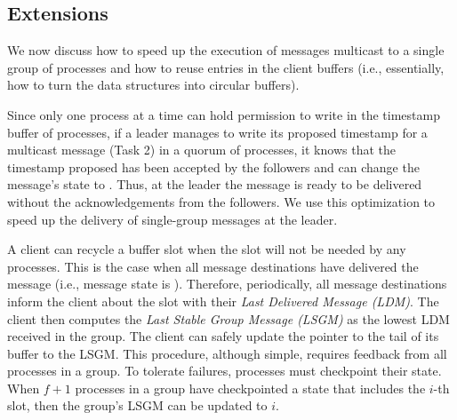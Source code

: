 






\subsection{Extensions}
\label{sec:extensions}

We now discuss how to speed up the execution of messages multicast to a single group of processes and how to reuse entries in the client buffers (i.e., essentially, how to turn the data structures into circular buffers).

Since only one process at a time can hold permission to write in the timestamp buffer of processes, if a leader manages to write its proposed timestamp for a multicast message (Task 2) in a quorum of processes, it knows that the timestamp proposed has been accepted by the followers and can change the message's state to \ordered.
Thus, at the leader the message is ready to be delivered without the acknowledgements from the followers.
We use this optimization to speed up the delivery of single-group messages at the leader.

A client can recycle a buffer slot when the slot will not be needed by any processes.
This is the case when all message destinations have delivered the message (i.e., message state is \done).
Therefore, periodically, all message destinations inform the client about the slot with their \emph{Last Delivered Message (LDM)}.
The client then computes the \emph{Last Stable Group Message (LSGM)} as the lowest LDM received in the group.
The client can safely update the pointer to the tail of its buffer to the LSGM.
This procedure, although simple, requires feedback from all processes in a group.
To tolerate failures, processes must checkpoint their state.
When $f+1$ processes in a group have checkpointed a state that includes the $i$-th slot, then the group's LSGM can be updated to $i$.






